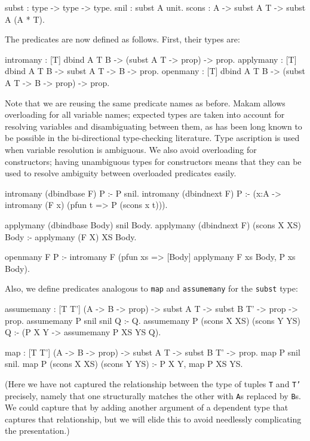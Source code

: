 \documentclass[format=acmlarge,review,anonymous]{acmart}\settopmatter{printfolios=true}
\begin{document}
\begin{codequote}
subst : type -> type -> type.
snil : subst A unit.
scons : A -> subst A T -> subst A (A * T).
\end{codequote}

The predicates are now defined as follows. First, their types are:

\begin{codequote}
intromany : [T] dbind A T B -> (subst A T -> prop) -> prop.
applymany : [T] dbind A T B -> subst A T -> B -> prop.
openmany : [T] dbind A T B -> (subst A T -> B -> prop) -> prop.
\end{codequote}

Note that we are reusing the same predicate names as before. Makam allows overloading for all
variable names; expected types are taken into account for resolving variables and disambiguating
between them, as has been long known to be possible in the bi-directional type-checking
literature. Type ascription is used when variable resolution is ambiguous. We also avoid overloading
for constructors; having unambiguous types for constructors means that they can be used to resolve
ambiguity between overloaded predicates easily.

\begin{codequote}
intromany (dbindbase F) P :- P snil.
intromany (dbindnext F) P :-
  (x:A -> intromany (F x) (pfun t => P (scons x t))).

applymany (dbindbase Body) snil Body.
applymany (dbindnext F) (scons X XS) Body :-
  applymany (F X) XS Body.

openmany F P :-
  intromany F (pfun xs => [Body] applymany F xs Body, P xs Body).
\end{codequote}

Also, we define predicates analogous to \texttt{map} and \texttt{assumemany} for the \texttt{subst}
type:

\begin{codequote}
assumemany : [T T'] (A -> B -> prop) -> subst A T -> subst B T' -> prop -> prop.
assumemany P snil snil Q :- Q.
assumemany P (scons X XS) (scons Y YS) Q :- (P X Y -> assumemany P XS YS Q).

map : [T T'] (A -> B -> prop) -> subst A T -> subst B T' -> prop.
map P snil snil.
map P (scons X XS) (scons Y YS) :- P X Y, map P XS YS.
\end{codequote}

(Here we have not captured the relationship between the type of tuples \texttt{T} and \texttt{T'}
precisely, namely that one structurally matches the other with \texttt{A}s replaced by
\texttt{B}s. We could capture that by adding another argument of a dependent type that captures that
relationship, but we will elide this to avoid needlessly complicating the presentation.)
\end{document}
